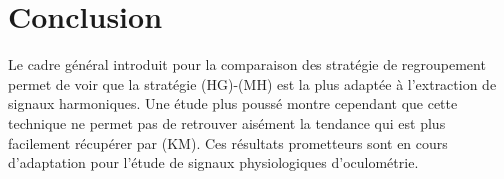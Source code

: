\documentclass{gretsi}
\begin{document}
\vspace{-.3cm}
\section{Conclusion}
\label{sec:ccl}

Le cadre général introduit pour la comparaison des stratégie de regroupement permet de voir que la stratégie (HG)-(MH) est la plus adaptée à l'extraction de signaux harmoniques. Une étude plus poussé montre cependant que cette technique ne permet pas de retrouver aisément la tendance qui est plus facilement récupérer par (KM). Ces résultats prometteurs sont en cours d'adaptation pour l'étude de signaux physiologiques d'oculométrie.


 
\scriptsize
{}
\end{document}
